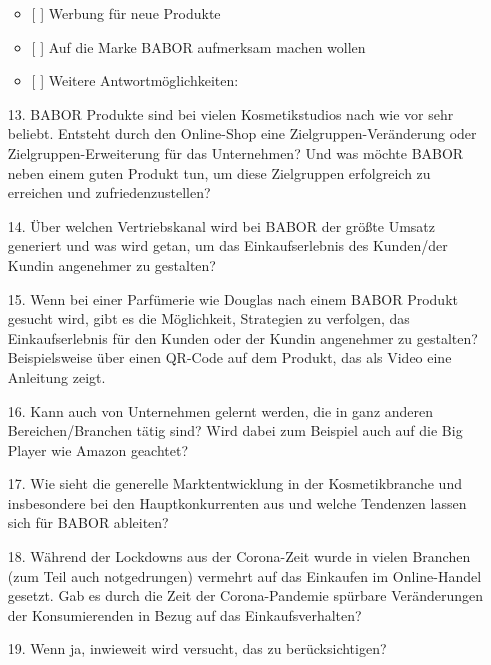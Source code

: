 \begin{enumerate}
\begin{itemize}
               \item{[ ] Werbung für neue Produkte}
               \item{[ ] Auf die Marke BABOR aufmerksam machen wollen}
               \item{[ ] Weitere Antwortmöglichkeiten:  }
             \end{itemize}
 \item[13.] BABOR Produkte sind bei vielen Kosmetikstudios nach wie vor sehr beliebt. Entsteht durch den Online-Shop eine Zielgruppen-Veränderung oder Zielgruppen-Erweiterung für das Unternehmen? Und was möchte BABOR neben einem guten Produkt tun, um diese Zielgruppen erfolgreich zu erreichen und zufriedenzustellen?
 \item[14.] Über welchen Vertriebskanal wird bei BABOR der größte Umsatz generiert und was wird getan, um das Einkaufserlebnis des Kunden/der Kundin angenehmer zu gestalten?
 \item[15.] Wenn bei einer Parfümerie wie Douglas nach einem BABOR Produkt gesucht wird, gibt es die Möglichkeit, Strategien zu verfolgen, das Einkaufserlebnis für den Kunden oder der Kundin angenehmer zu gestalten? Beispielsweise über einen QR-Code auf dem Produkt, das als Video eine Anleitung zeigt.
 \item[16.] Kann auch von Unternehmen gelernt werden, die in ganz anderen Bereichen/Branchen tätig sind? Wird dabei zum Beispiel auch auf die Big Player wie Amazon geachtet?
 \item[17.] Wie sieht die generelle Marktentwicklung in der Kosmetikbranche und insbesondere bei den Hauptkonkurrenten aus und welche Tendenzen lassen sich für BABOR ableiten?
 \item[18.] Während der Lockdowns aus der Corona-Zeit wurde in vielen Branchen (zum Teil auch notgedrungen) vermehrt auf das Einkaufen im Online-Handel gesetzt. Gab es durch die Zeit der Corona-Pandemie spürbare Veränderungen der Konsumierenden in Bezug auf das Einkaufsverhalten?
 \item[19.] Wenn ja, inwieweit wird versucht, das zu berücksichtigen?
\end{enumerate}